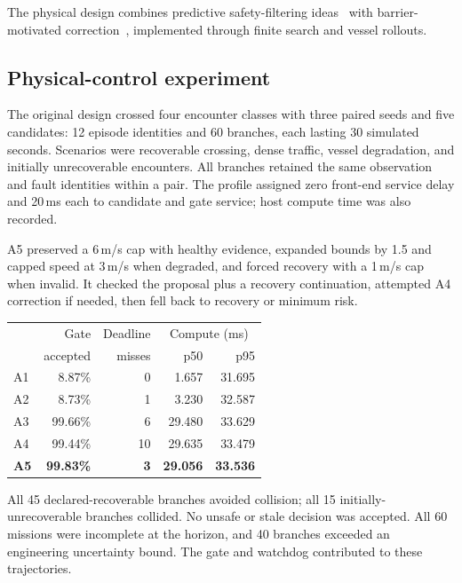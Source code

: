 \documentclass[sigconf,nonacm]{acmart}
\begin{document}
The physical design combines predictive safety-filtering ideas~\cite{wabersich} with barrier-motivated correction~\cite{ames}, implemented through finite search and vessel rollouts.

\subsection{Physical-control experiment}
The original design crossed four encounter classes with three paired seeds and five candidates: 12 episode identities and 60 branches, each lasting 30 simulated seconds. Scenarios were recoverable crossing, dense traffic, vessel degradation, and initially unrecoverable encounters. All branches retained the same observation and fault identities within a pair. The profile assigned zero front-end service delay and 20\,ms each to candidate and gate service; host compute time was also recorded.

A5 preserved a 6\,m/s cap with healthy evidence, expanded bounds by 1.5 and capped speed at 3\,m/s when degraded, and forced recovery with a 1\,m/s cap when invalid. It checked the proposal plus a recovery continuation, attempted A4 correction if needed, then fell back to recovery or minimum risk.

\begin{center}
\begin{minipage}{\columnwidth}
\centering
{}
\small
\begin{tabular}{@{}lrrrr@{}}
\toprule
 & Gate & Deadline & \multicolumn{2}{c}{Compute (ms)}\\
 & accepted & misses & p50 & p95\\
\midrule
A1 & 8.87\% & 0 & 1.657 & 31.695\\
A2 & 8.73\% & 1 & 3.230 & 32.587\\
A3 & 99.66\% & 6 & 29.480 & 33.629\\
A4 & 99.44\% & 10 & 29.635 & 33.479\\
\textbf{A5} & \textbf{99.83\%} & \textbf{3} & \textbf{29.056} & \textbf{33.536}\\
\bottomrule
\end{tabular}
\end{minipage}
\end{center}

All 45 declared-recoverable branches avoided collision; all 15 initially-unrecoverable branches collided. No unsafe or stale decision was accepted. All 60 missions were incomplete at the horizon, and 40 branches exceeded an engineering uncertainty bound. The gate and watchdog contributed to these trajectories.
\end{document}

